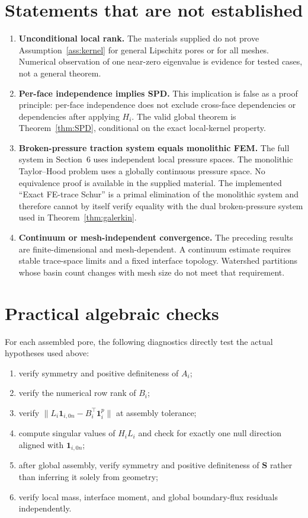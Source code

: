 \documentclass[11pt,a4paper]{article}
\newcommand{\Schur}{\mathbf S}
\newcommand{\one}{\bm 1}
\begin{document}
\section{Statements that are not established}

\begin{enumerate}[leftmargin=*,itemsep=4pt]
 \item \textbf{Unconditional local rank.}
 The materials supplied do not prove Assumption~\ref{ass:kernel} for general
 Lipschitz pores or for all meshes.  Numerical observation of one near-zero
 eigenvalue is evidence for tested cases, not a general theorem.

 \item \textbf{Per-face independence implies SPD.}
 This implication is false as a proof principle: per-face independence does
 not exclude cross-face dependencies or dependencies after applying $H_i$.
 The valid global theorem is Theorem~\ref{thm:SPD}, conditional on the exact
 local-kernel property.

 \item \textbf{Broken-pressure traction system equals monolithic FEM.}
 The full system in Section~6 uses independent local pressure spaces.  The
 monolithic Taylor--Hood problem uses a globally continuous pressure space.
 No equivalence proof is available in the supplied material.  The implemented
 ``Exact FE-trace Schur'' is a primal elimination of the monolithic system and
 therefore cannot by itself verify equality with the dual broken-pressure
 system used in Theorem~\ref{thm:galerkin}.

 \item \textbf{Continuum or mesh-independent convergence.}
 The preceding results are finite-dimensional and mesh-dependent.  A
 continuum estimate requires stable trace-space limits and a fixed interface
 topology.  Watershed partitions whose basin count changes with mesh size do
 not meet that requirement.
\end{enumerate}

\section{Practical algebraic checks}

For each assembled pore, the following diagnostics directly test the actual
hypotheses used above:
\begin{enumerate}[leftmargin=*,nosep]
 \item verify symmetry and positive definiteness of $A_i$;
 \item verify the numerical row rank of $B_i$;
 \item verify
 $\|L_i\one_{i,0n}-B_i^\top\mathbf1_i^p\|$ at assembly tolerance;
 \item compute singular values of $H_iL_i$ and check for exactly one null
 direction aligned with $\one_{i,0n}$;
 \item after global assembly, verify symmetry and positive definiteness of
 $\Schur$ rather than inferring it solely from geometry;
 \item verify local mass, interface moment, and global boundary-flux
 residuals independently.
\end{enumerate}
\end{document}
